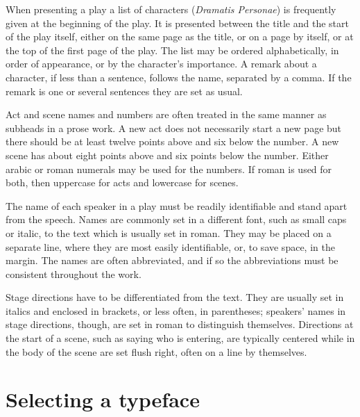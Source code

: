 \documentclass[10pt,a4paper,oneside,extrafontsizes]{memoir}%
\newcommand{\PWnote}[2]{}
\begin{document}
\begin{paracol}{2}
\switchEng
    When presenting a play a list of characters 
(\textit{Dramatis Personae})
is frequently given at the beginning of the play. It is presented between the
title and the start of the play itself, either on the same page as the title, 
or on a page by itself, or at the top of the first page of the play. The 
list may be ordered alphabetically, in order of appearance, or by the 
character's importance. A remark about a character, if less than a sentence, 
follows the name, separated by a comma. If the remark is one or several 
sentences they are set as usual.

    Act and scene 
names and numbers are often treated in the same manner as
subheads in a prose work. A new act does not necessarily start a new page
but there should be at least twelve points above and six below the number.
A new scene has about eight points above and six points below the number.
Either arabic or roman numerals may be used for the numbers. If roman
is used for both, then uppercase for acts and lowercase for scenes.

   The name of each speaker in a play must be readily 
identifiable and stand apart from the speech. Names are commonly set in a 
different font, such as small caps or italic, to the text which is usually set
in roman. They may be placed on a separate line, where they are most easily
identifiable, or, to save space, in the margin. The names are often 
abbreviated, and if so the abbreviations must be consistent throughout 
the work.

    Stage directions 
have to be differentiated from the text. They are usually set in italics 
and enclosed in brackets, or less often, in parentheses; speakers' names 
in stage directions, though, are set in roman to distinguish themselves. 
Directions at the start of a scene, such as saying who is entering, are 
typically centered while in the body of the scene are set flush right, 
often on a line by themselves.
\end{paracol}

\PWnote{2009/04/26}{Added section on selecting a typeface}
\section{Selecting a typeface}
\end{document}
